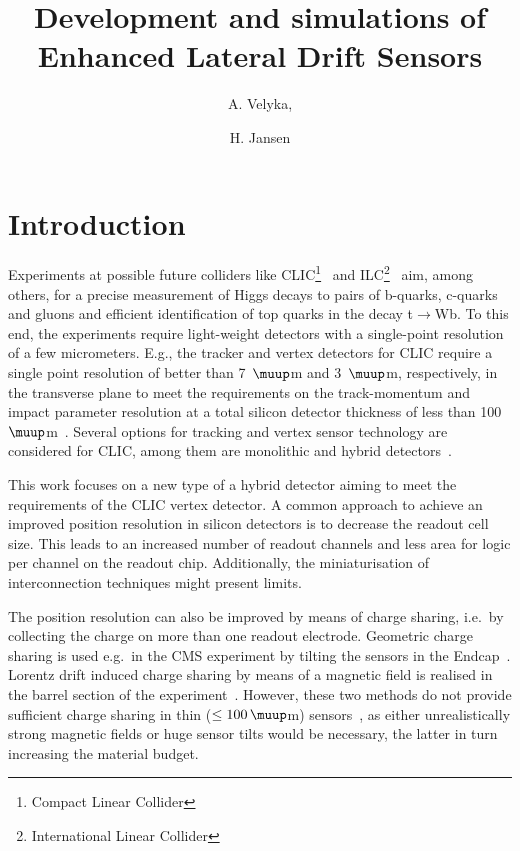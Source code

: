 \documentclass[a4paper,11pt]{article}
\title{Development and simulations of Enhanced Lateral Drift Sensors}
\author[a,1]{A. Velyka,\note{Corresponding author.}}
\author[a]{H. Jansen}
\affiliation[a]{Deutsches Elektronen-Synchrotron DESY,\\Notkestra\ss e 85, 22607 Hamburg, Germany}
\begin{document}
\maketitle
\flushbottom


\section{Introduction}
\label{sec:intro}

Experiments at possible future colliders like CLIC\footnote{Compact Linear Collider}~\cite{cdr} and ILC\footnote{International Linear Collider}~\cite{ILCcdr} aim, among others,
 for a precise measurement of Higgs decays to pairs of b-quarks, c-quarks and gluons and efficient identification of top quarks in the decay t$\mathrm{\rightarrow}$Wb.
To this end, the experiments require light-weight detectors with a single-point resolution of a few micrometers. 
E.g., the tracker and vertex detectors for CLIC require a single point resolution of better than 7~$\muup$m and 3~$\muup$m, respectively, in the transverse plane
 to meet the requirements on the track-momentum and impact parameter resolution at a total silicon detector thickness of less than 100~$\muup$m~\cite{det}.
Several options for tracking and vertex sensor technology are considered for CLIC, among them are monolithic and hybrid detectors~\cite{clicyellowreport}.

This work focuses on a new type of a hybrid detector aiming to meet the requirements of the CLIC vertex detector.
A common approach to achieve an improved position resolution in silicon detectors is to decrease the readout cell size.
This leads to an increased number of readout channels and less area for logic per channel on the readout chip.
Additionally, the miniaturisation of interconnection techniques might present limits. 

The position resolution can also be improved by means of charge sharing, i.e.\ by collecting the charge on more than one readout electrode.
Geometric charge sharing is used e.g.\ in the CMS experiment by tilting the sensors in the Endcap~\cite{simon}. 
Lorentz drift induced charge sharing by means of a magnetic field is realised in the barrel section of the experiment~\cite{cmstdr}.
However, these two methods do not provide sufficient charge sharing in thin ($\leq 100\,\muup$m) sensors~\cite{clicyellowreport},
 as either unrealistically strong magnetic fields or huge sensor tilts would be necessary, the latter in turn increasing the material budget.
\end{document}
